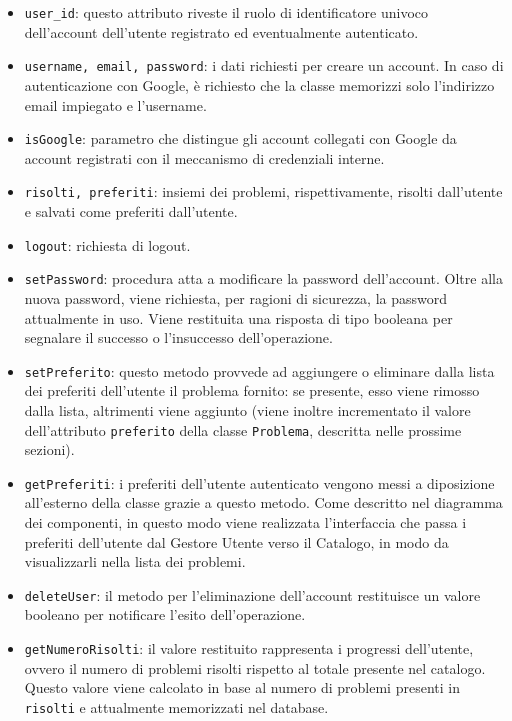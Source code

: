 \documentclass[11pt, a4paper]{article}
\theoremstyle{definition} %
\begin{document}
\begin{itemize}
    \item \texttt{user\_id}: questo attributo riveste il ruolo di identificatore
    univoco dell'account dell'utente registrato ed eventualmente autenticato.

    \item \texttt{username, email, password}: i dati richiesti per creare un
    account. In caso di autenticazione con Google, è richiesto che la classe
    memorizzi solo l'indirizzo email impiegato e l'username.

    \item \texttt{isGoogle}: parametro che distingue gli account collegati con
    Google da account registrati con il meccanismo di credenziali interne.

    \item \texttt{risolti, preferiti}: insiemi dei problemi, rispettivamente,
    risolti dall'utente e salvati come preferiti dall'utente.

    \item \texttt{logout}: richiesta di logout.
    
    \item \texttt{setPassword}: procedura atta a modificare la password
    dell'account. Oltre alla nuova password, viene richiesta, per ragioni di
    sicurezza, la password attualmente in uso. Viene restituita una risposta
    di tipo booleana per segnalare il successo o l'insuccesso dell'operazione.

    \item \texttt{setPreferito}: questo metodo provvede ad aggiungere o
    eliminare dalla lista dei preferiti dell'utente il problema fornito: se
    presente, esso viene rimosso dalla lista, altrimenti viene aggiunto
    (viene inoltre incrementato il valore dell'attributo \texttt{preferito}
    della classe \texttt{Problema}, descritta nelle prossime sezioni).

    \item \texttt{getPreferiti}: i preferiti dell'utente autenticato vengono
    messi a diposizione all'esterno della classe grazie a questo metodo.
    Come descritto nel diagramma dei componenti, in questo modo viene
    realizzata l'interfaccia che passa i preferiti dell'utente dal Gestore
    Utente verso il Catalogo, in modo da visualizzarli nella lista dei
    problemi.

    \item \texttt{deleteUser}: il metodo per l'eliminazione dell'account
    restituisce un valore booleano per notificare l'esito dell'operazione.

    \item \texttt{getNumeroRisolti}: il valore restituito rappresenta i
    progressi dell'utente, ovvero il numero di problemi risolti rispetto
    al totale presente nel catalogo. Questo valore viene calcolato in base
    al numero di problemi presenti in \texttt{risolti} e attualmente
    memorizzati nel database.
\end{itemize}
\end{document}
